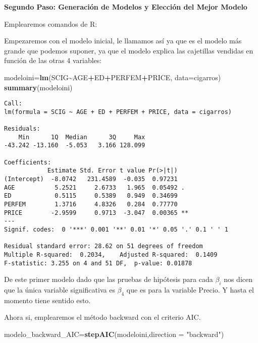 \documentclass[
  a4paper,
  oneside,
  openany]{book}
\newenvironment{Shaded}{\begin{snugshade}}{\end{snugshade}}
\newcommand{\DataTypeTok}[1]{\textcolor[rgb]{0.13,0.29,0.53}{#1}}
\newcommand{\KeywordTok}[1]{\textcolor[rgb]{0.13,0.29,0.53}{\textbf{#1}}}
\newcommand{\NormalTok}[1]{#1}
\newcommand{\OperatorTok}[1]{\textcolor[rgb]{0.81,0.36,0.00}{\textbf{#1}}}
\newcommand{\StringTok}[1]{\textcolor[rgb]{0.31,0.60,0.02}{#1}}
\begin{document}
\textbf{Segundo Paso: Generación de Modelos y Elección del Mejor Modelo}

Emplearemos comandos de R:

Empezaremos con el modelo inicial, le llamamos así ya que es el modelo más grande que podemos suponer, ya que el modelo explica las cajetillas vendidas en función de las otras 4 variables:

\begin{Shaded}
\begin{Highlighting}[]
\NormalTok{modeloini=}\KeywordTok{lm}\NormalTok{(SCIG}\OperatorTok{\textasciitilde{}}\NormalTok{AGE}\OperatorTok{+}\NormalTok{ED}\OperatorTok{+}\NormalTok{PERFEM}\OperatorTok{+}\NormalTok{PRICE, }\DataTypeTok{data=}\NormalTok{cigarros) }
\KeywordTok{summary}\NormalTok{(modeloini)}
\end{Highlighting}
\end{Shaded}

\begin{verbatim}
Call:
lm(formula = SCIG ~ AGE + ED + PERFEM + PRICE, data = cigarros)

Residuals:
    Min      1Q  Median      3Q     Max 
-43.242 -13.160  -5.053   3.166 128.099 

Coefficients:
            Estimate Std. Error t value Pr(>|t|)   
(Intercept)  -8.0742   231.4589  -0.035  0.97231   
AGE           5.2521     2.6733   1.965  0.05492 . 
ED            0.5115     0.5389   0.949  0.34699   
PERFEM        1.3716     4.8326   0.284  0.77770   
PRICE        -2.9599     0.9713  -3.047  0.00365 **
---
Signif. codes:  0 '***' 0.001 '**' 0.01 '*' 0.05 '.' 0.1 ' ' 1

Residual standard error: 28.62 on 51 degrees of freedom
Multiple R-squared:  0.2034,    Adjusted R-squared:  0.1409 
F-statistic: 3.255 on 4 and 51 DF,  p-value: 0.01878
\end{verbatim}

De este primer modelo dado que las pruebas de hipótesis para cada \(\beta_{i}\) nos dicen que la única variable significativa es \(\beta_{4}\) que es para la variable Precio. Y hasta el momento tiene sentido esto.

Ahora si, emplearemos el método backward con el criterio AIC.

\begin{Shaded}
\begin{Highlighting}[]
\NormalTok{modelo\_backward\_AIC=}\KeywordTok{stepAIC}\NormalTok{(modeloini,}\DataTypeTok{direction =} \StringTok{"backward"}\NormalTok{)}
\end{Highlighting}
\end{Shaded}
\end{document}
